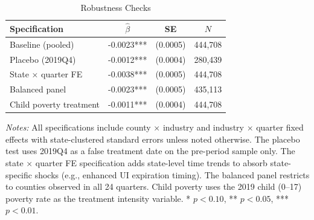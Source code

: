 \begin{table}[H]
\centering
\caption{Robustness Checks}
\label{tab:robustness}
\begin{threeparttable}
\begin{tabular}{lccc}
\toprule
Specification & $\hat{\beta}$ & SE & $N$ \\
\midrule
Baseline (pooled) & -0.0023*** & (0.0005) & 444,708 \\
Placebo (2019Q4) & -0.0012*** & (0.0004) & 280,439 \\
State × quarter FE & -0.0038*** & (0.0005) & 444,708 \\
Balanced panel & -0.0023*** & (0.0005) & 435,113 \\
Child poverty treatment & -0.0011*** & (0.0004) & 444,708 \\
\bottomrule
\end{tabular}
\begin{tablenotes}[flushleft]
\small
\item \textit{Notes:} All specifications include county $\times$ industry and industry $\times$ quarter fixed effects with state-clustered standard errors unless noted otherwise. The placebo test uses 2019Q4 as a false treatment date on the pre-period sample only. The state $\times$ quarter FE specification adds state-level time trends to absorb state-specific shocks (e.g., enhanced UI expiration timing). The balanced panel restricts to counties observed in all 24 quarters. Child poverty uses the 2019 child (0--17) poverty rate as the treatment intensity variable. * $p<0.10$, ** $p<0.05$, *** $p<0.01$.
\end{tablenotes}
\end{threeparttable}
\end{table}
